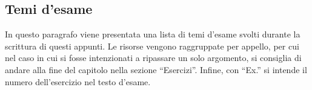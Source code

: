 \documentclass[a4paper]{article}
\newcommand{\dquotes}[1]{``#1''}
\begin{document}
	\subsection{Temi d'esame}

	In questo paragrafo viene presentata una lista di temi d'esame svolti durante la scrittura di questi appunti. Le risorse vengono raggruppate per appello, per cui nel caso in cui si fosse intenzionati a ripassare un solo argomento, si consiglia di andare alla fine del capitolo nella sezione \dquotes{Esercizi}. Infine, con \dquotes{Ex.} si intende il numero dell'esercizio nel testo d'esame.
\end{document}
